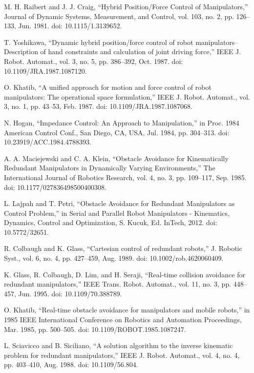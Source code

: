 \documentclass[letterpaper, 10 pt, conference]{ieeeconf}  %
\begin{document}
\begin{thebibliography}{99}
 M. H. Raibert and J. J. Craig, “Hybrid Position/Force Control of Manipulators,” Journal of Dynamic Systems, Measurement, and Control, vol. 103, no. 2, pp. 126–133, Jun. 1981. doi: 10.1115/1.3139652.

 T. Yoshikawa, “Dynamic hybrid position/force control of robot manipulators--Description of hand constraints and calculation of joint driving force,” IEEE J. Robot. Automat., vol. 3, no. 5, pp. 386–392, Oct. 1987. doi: 10.1109/JRA.1987.1087120.

 O. Khatib, “A unified approach for motion and force control of robot manipulators: The operational space formulation,” IEEE J. Robot. Automat., vol. 3, no. 1, pp. 43–53, Feb. 1987. doi: 10.1109/JRA.1987.1087068.

 N. Hogan, “Impedance Control: An Approach to Manipulation,” in Proc. 1984 American Control Conf., San Diego, CA, USA, Jul. 1984, pp. 304–313. doi: 10.23919/ACC.1984.4788393.

 A. A. Maciejewski and C. A. Klein, “Obstacle Avoidance for Kinematically Redundant Manipulators in Dynamically Varying Environments,” The International Journal of Robotics Research, vol. 4, no. 3, pp. 109–117, Sep. 1985. doi: 10.1177/027836498500400308.

 L. Lajpah and T. Petri, “Obstacle Avoidance for Redundant Manipulators as Control Problem,” in Serial and Parallel Robot Manipulators - Kinematics, Dynamics, Control and Optimization, S. Kucuk, Ed. InTech, 2012. doi: 10.5772/32651.

 R. Colbaugh and K. Glass, “Cartesian control of redundant robots,” J. Robotic Syst., vol. 6, no. 4, pp. 427–459, Aug. 1989. doi: 10.1002/rob.4620060409.

 K. Glass, R. Colbaugh, D. Lim, and H. Seraji, “Real-time collision avoidance for redundant manipulators,” IEEE Trans. Robot. Automat., vol. 11, no. 3, pp. 448–457, Jun. 1995. doi: 10.1109/70.388789.

 O. Khatib, “Real-time obstacle avoidance for manipulators and mobile robots,” in 1985 IEEE International Conference on Robotics and Automation Proceedings, Mar. 1985, pp. 500–505. doi: 10.1109/ROBOT.1985.1087247.

 L. Sciavicco and B. Siciliano, “A solution algorithm to the inverse kinematic problem for redundant manipulators,” IEEE J. Robot. Automat., vol. 4, no. 4, pp. 403–410, Aug. 1988. doi: 10.1109/56.804.


\end{thebibliography}
\end{document}
